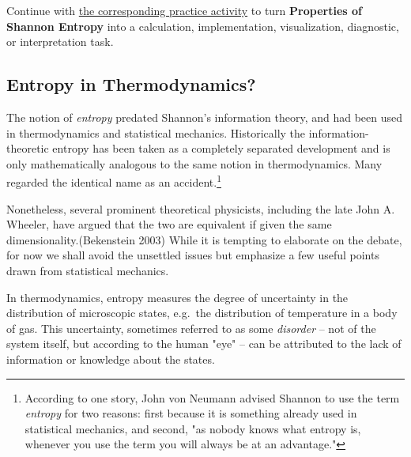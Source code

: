 \documentclass[
  letterpaper,
]{scrbook}
\begin{document}
\begin{tcolorbox}[enhanced jigsaw, arc=.35mm, bottomrule=.15mm, bottomtitle=1mm, breakable, colback=white, colbacktitle=quarto-callout-tip-color!10!white, colframe=quarto-callout-tip-color-frame, coltitle=black, left=2mm, leftrule=.75mm, opacityback=0, opacitybacktitle=0.6, rightrule=.15mm, title=\textcolor{quarto-callout-tip-color}{\faLightbulb}\hspace{0.5em}{Put it into practice}, titlerule=0mm, toprule=.15mm, toptitle=1mm]

Continue with \hyperref[sec-pr-05-properties-of-shannon-entropy]{the
corresponding practice activity} to turn \textbf{Properties of Shannon
Entropy} into a calculation, implementation, visualization, diagnostic,
or interpretation task.

\end{tcolorbox}

\subsection{Entropy in Thermodynamics?}\label{entropy-in-thermodynamics}

The notion of \emph{entropy} predated Shannon's information theory, and
had been used in thermodynamics and statistical mechanics. Historically
the information-theoretic entropy has been taken as a completely
separated development and is only mathematically analogous to the same
notion in thermodynamics. Many regarded the identical name as an
accident.\footnote{According to one story, John von Neumann advised
  Shannon to use the term \emph{entropy} for two reasons: first because
  it is something already used in statistical mechanics, and second, "as
  nobody knows what entropy is, whenever you use the term you will
  always be at an advantage."}

Nonetheless, several prominent theoretical physicists, including the
late John A. Wheeler, have argued that the two are equivalent if given
the same dimensionality.(Bekenstein 2003) While it is tempting to
elaborate on the debate, for now we shall avoid the unsettled issues but
emphasize a few useful points drawn from statistical mechanics.

In thermodynamics, entropy measures the degree of uncertainty in the
distribution of microscopic states, e.g.~the distribution of temperature
in a body of gas. This uncertainty, sometimes referred to as some
\emph{disorder} -- not of the system itself, but according to the human
"eye" -- can be attributed to the lack of information or knowledge about
the states.
\end{document}
